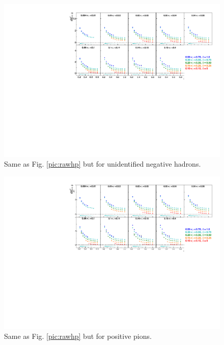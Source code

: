 \begin{figure}[!h]
  \includegraphics[scale=0.85]{./gfx/rawhm.pdf}
  \caption{Same as Fig. \ref{pic:rawhp} but for unidentified negative hadrons.}
  \label{pic:rawhm}
\end{figure}

\begin{figure}[!h]
  \includegraphics[scale=0.85]{./gfx/rawpip.pdf}
  \caption{Same as Fig. \ref{pic:rawhp} but for positive pions.}
  \label{pic:rawpip}
\end{figure}

